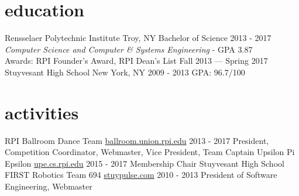 \documentclass[]{friggeri-cv}
\begin{document}
\section{education}

\begin{entrylist}
  \entryheader
    {Rensselaer Polytechnic Institute}
    {Troy, NY}
  \entry
    {Bachelor of Science}
    {2013 - 2017}
    {\emph{Computer Science and Computer \& Systems Engineering} - GPA 3.87\\
    Awards: RPI Founder's Award, RPI Dean's List Fall 2013 --- Spring 2017\\}
  \entryheader
    {Stuyvesant High School}
    {New York, NY}
  \entry
    {}
    {2009 - 2013}
    {GPA: 96.7/100}
\end{entrylist}

\section{activities}

\begin{entrylist}
  \entryheader
    {RPI Ballroom Dance Team}
    {\href{http://ballroom.union.rpi.edu}{ballroom.union.rpi.edu}}
  \entry
    {}
    {2013 - 2017}
    {President, Competition Coordinator, Webmaster, Vice President, Team Captain}
  \entryheader
    {Upsilon Pi Epsilon}
    {\href{http://upe.cs.rpi.edu}{upe.cs.rpi.edu}}
  \entry
    {}
    {2015 - 2017}
    {Membership Chair}
  \entryheader
    {Stuyvesant High School FIRST Robotics Team 694}
    {\href{http://stuypulse.com}{stuypulse.com}}
  \entry
    {}
    {2010 - 2013}
    {President of Software Engineering, Webmaster}
\end{entrylist}
\end{document}
